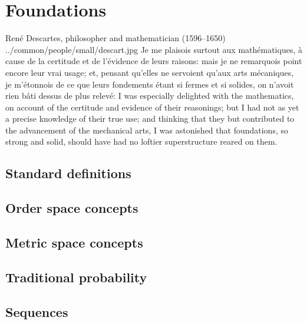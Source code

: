 \chapter{Foundations}
\qboxnpqt
  {Ren\'e Descartes, philosopher and mathematician (1596--1650)
   \footnotemark}
  {../common/people/small/descart.jpg}
  {Je me plaisois surtout aux math\'ematiques,
    \`a cause de la certitude et de l'\'evidence de leurs raisons:
    mais je ne remarquois point encore leur vrai usage;
    et, pensant qu'elles ne servoient qu'aux arts m\'ecaniques,
    je m'\'etonnois de ce que leurs fondements \'etant si fermes et si solides,
    on n'avoit rien b\^ati dessus de plus relev\'e:}
  {I was especially delighted with the mathematics,
    on account of the certitude and evidence of their reasonings;
    but I had not as yet a precise knowledge of their true use;
    and thinking that they but contributed to the advancement of the mechanical arts,
    I was astonished that foundations, so strong and solid,
    should have had no loftier superstructure reared on them.}



\section{Standard definitions}
  
  
  
  

\section{Order space concepts}
  
  
  
  

\section{Metric space concepts}
  
  
  

\section{Traditional probability}
  
  

\section{Sequences}
  
  
  


